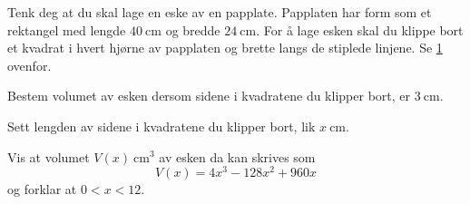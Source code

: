\begin{figure}[H]
  \centering
  \caption{}
  \label{fig:Forkurs-1p-2p-laererutdanning-2018-V-U-oppgave-2-5}
\end{figure}

Tenk deg at du skal lage en eske av en papplate. Papplaten har form som et
rektangel med lengde $\SI{40}{\cm}$ og bredde $\SI{24}{\cm}$. For å lage esken
skal du klippe bort et kvadrat i hvert hjørne av papplaten og brette langs de
stiplede linjene. Se
\cref{fig:Forkurs-1p-2p-laererutdanning-2018-V-U-oppgave-2-5} ovenfor.

\begin{oppgaver}
   Bestem volumet av esken dersom sidene i kvadratene du klipper bort,
  er $\SI{3}{\cm}$.
\end{oppgaver}

Sett lengden av sidene i kvadratene du klipper bort, lik $x~\si{\cm}$.

\begin{oppgaver}
   Vis at volumet $V(x)~\si{\cm\cubed}$ av esken da kan skrives som
    \begin{equation*}
      V(x) = 4x^3 - 128x^2 + 960x
    \end{equation*}
    og forklar at $0 < x < 12$.
\end{oppgaver}

